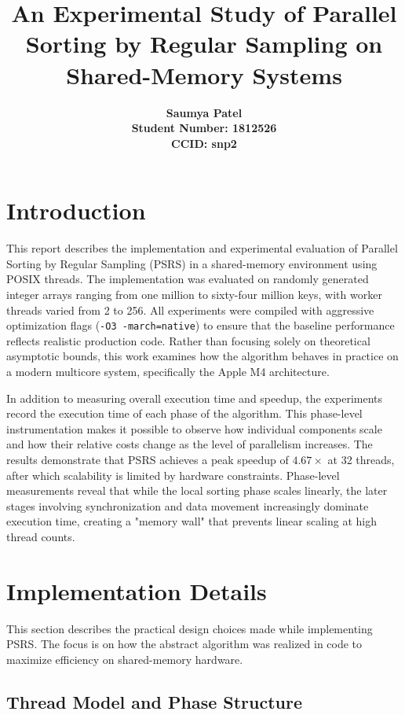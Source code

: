 \documentclass[11pt]{article}
\title{\vspace{2cm}\Huge\bfseries An Experimental Study of Parallel Sorting by Regular Sampling on Shared-Memory Systems}
\author{\vspace{1cm}\Large\bfseries Saumya Patel \\
        \large Student Number: 1812526 \\
        \large CCID: snp2}
\date{}
\begin{document}
\maketitle
\newpage

\section{Introduction}

This report describes the implementation and experimental evaluation of Parallel Sorting by Regular Sampling (PSRS) in a shared-memory environment using POSIX threads. The implementation was evaluated on randomly generated integer arrays ranging from one million to sixty-four million keys, with worker threads varied from 2 to 256. All experiments were compiled with aggressive optimization flags (\texttt{-O3 -march=native}) to ensure that the baseline performance reflects realistic production code. Rather than focusing solely on theoretical asymptotic bounds, this work examines how the algorithm behaves in practice on a modern multicore system, specifically the Apple M4 architecture.

In addition to measuring overall execution time and speedup, the experiments record the execution time of each phase of the algorithm. This phase-level instrumentation makes it possible to observe how individual components scale and how their relative costs change as the level of parallelism increases. The results demonstrate that PSRS achieves a peak speedup of $4.67\times$ at 32 threads, after which scalability is limited by hardware constraints. Phase-level measurements reveal that while the local sorting phase scales linearly, the later stages involving synchronization and data movement increasingly dominate execution time, creating a "memory wall" that prevents linear scaling at high thread counts.

\section{Implementation Details}

This section describes the practical design choices made while implementing PSRS. The focus is on how the abstract algorithm was realized in code to maximize efficiency on shared-memory hardware.

\subsection{Thread Model and Phase Structure}
\end{document}
